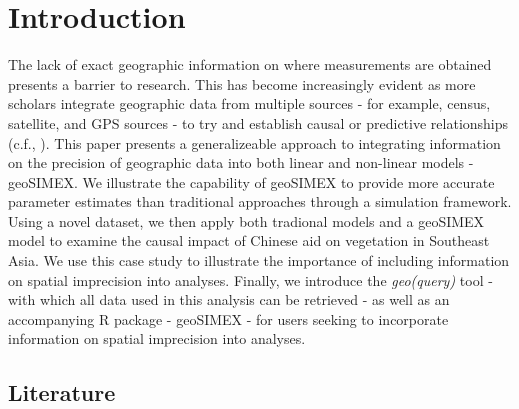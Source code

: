 \section{Introduction}
The lack of exact geographic information on where measurements are obtained presents a barrier to research.
This has become increasingly evident as more scholars integrate geographic data from multiple sources - for example, census, satellite, and GPS sources - to try and establish causal or predictive relationships (c.f., \cite{bare_assessing_2015,buntaine_titling_2015,gallo_mapping_2012,andam_measuring_2008,buchanan_impacts_2016,benyishay_indigenous_2016,runfola_migration_2016,runfola_multi-criteria_2015}).
This paper presents a generalizeable approach to integrating information on the precision of geographic data into both linear and non-linear models - geoSIMEX.
We illustrate the capability of geoSIMEX to provide more accurate parameter estimates than traditional approaches through a simulation framework. 
Using a novel dataset, we then apply both tradional models and a geoSIMEX model to examine the causal impact of Chinese aid on vegetation in Southeast Asia.
We use this case study to illustrate the importance of including information on spatial imprecision into analyses.
Finally, we introduce the \textit{geo(query)} tool - with which all data used in this analysis can be retrieved - as well as an accompanying R package - geoSIMEX - for users seeking to incorporate information on spatial imprecision into analyses.

\subsection{Literature}

